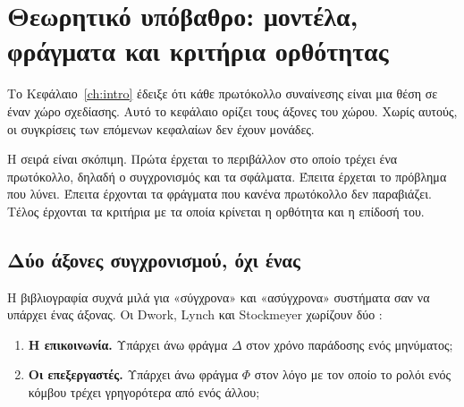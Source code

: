 %

\chapter{Θεωρητικό υπόβαθρο: μοντέλα, φράγματα και κριτήρια ορθότητας}
\label{ch:background}

Το Κεφάλαιο~\ref{ch:intro} έδειξε ότι κάθε πρωτόκολλο συναίνεσης είναι
μια θέση σε έναν χώρο σχεδίασης. Αυτό το κεφάλαιο ορίζει τους άξονες του
χώρου. Χωρίς αυτούς, οι συγκρίσεις των επόμενων κεφαλαίων δεν έχουν
μονάδες.

Η σειρά είναι σκόπιμη. Πρώτα έρχεται το περιβάλλον στο οποίο τρέχει ένα
πρωτόκολλο, δηλαδή ο συγχρονισμός και τα σφάλματα. Έπειτα έρχεται το
πρόβλημα που λύνει. Έπειτα έρχονται τα φράγματα που κανένα πρωτόκολλο
δεν παραβιάζει. Τέλος έρχονται τα κριτήρια με τα οποία κρίνεται η
ορθότητα και η επίδοσή του.

\section{Δύο άξονες συγχρονισμού, όχι ένας}
\label{sec:synchrony}

Η βιβλιογραφία συχνά μιλά για «σύγχρονα» και «ασύγχρονα» συστήματα σαν
να υπάρχει ένας άξονας. Οι Dwork, Lynch και Stockmeyer χωρίζουν δύο
\cite{dwork1988consensus}:

\begin{enumerate}[label=\textbf{(\alph*)},leftmargin=2.4em]
  \item \textbf{Η επικοινωνία.} Υπάρχει άνω φράγμα $\Delta$ στον χρόνο
  παράδοσης ενός μηνύματος;
  \item \textbf{Οι επεξεργαστές.} Υπάρχει άνω φράγμα $\Phi$ στον λόγο με
  τον οποίο το ρολόι ενός κόμβου τρέχει γρηγορότερα από ενός άλλου;
\end{enumerate}

